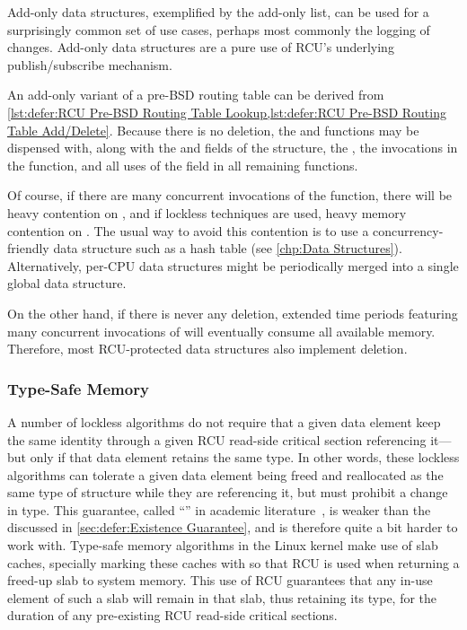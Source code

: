 Add-only data structures, exemplified by the add-only list, can be used
for a surprisingly common set of use cases, perhaps most commonly the
logging of changes.
Add-only data structures are a pure use of RCU's underlying
publish/subscribe mechanism.

An add-only variant of a pre-BSD routing table can be derived from
\cref{lst:defer:RCU Pre-BSD Routing Table Lookup,lst:defer:RCU Pre-BSD Routing Table Add/Delete}.
Because there is no deletion, the  and 
functions may be dispensed with, along with the 
and  fields of the  structure, the
, the  invocations in the
 function, and all uses of the  field
in all remaining functions.

Of course, if there are many concurrent invocations of the 
function, there will be heavy contention on , and if lockless
techniques are used, heavy memory contention on .
The usual way to avoid this contention is to use a concurrency-friendly
data structure such as a hash table (see \cref{chp:Data Structures}).
Alternatively, per-CPU data structures might be periodically merged
into a single global data structure.

On the other hand, if there is never any deletion, extended time periods
featuring many concurrent invocations of  will eventually
consume all available memory.
Therefore, most RCU-protected data structures also implement deletion.

\subsubsection{Type-Safe Memory}
\label{sec:defer:Type-Safe Memory}

A number of lockless algorithms do not require that a given data
element keep the same identity through a given RCU read-side critical
section referencing it---but only if that data element retains the
same type.
In other words, these lockless algorithms can tolerate a given data
element being freed and reallocated as the same type of structure
while they are referencing it, but must prohibit a change in type.
This guarantee, called ``'' in
academic literature~\cite{Cheriton96a},
is weaker than the  discussed
in \cref{sec:defer:Existence Guarantee},
and is therefore quite a bit harder to work with.
Type-safe memory algorithms in the Linux kernel make use of slab caches,
specially marking these caches with 
so that RCU is used when returning a freed-up
slab to system memory.
This use of RCU guarantees that any in-use element of
such a slab will remain in that slab, thus retaining its type,
for the duration of any pre-existing RCU read-side critical sections.

